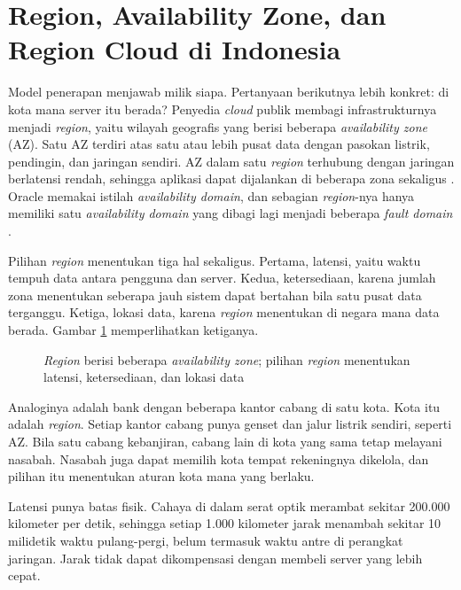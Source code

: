 \section{Region, Availability Zone, dan Region Cloud di Indonesia}

Model penerapan menjawab milik siapa. Pertanyaan berikutnya lebih konkret: di kota mana
server itu berada? Penyedia \textit{cloud} publik membagi infrastrukturnya menjadi
\textit{region}, yaitu wilayah geografis yang berisi beberapa \textit{availability zone}
(AZ). Satu AZ terdiri atas satu atau lebih pusat data dengan pasokan listrik, pendingin, dan
jaringan sendiri. AZ dalam satu \textit{region} terhubung dengan jaringan berlatensi rendah,
sehingga aplikasi dapat dijalankan di beberapa zona sekaligus
\cite{c02-aws-regions,c02-gcp-zones}. Oracle memakai istilah \textit{availability domain},
dan sebagian \textit{region}-nya hanya memiliki satu \textit{availability domain} yang
dibagi lagi menjadi beberapa \textit{fault domain} \cite{c02-oci-regions}.

Pilihan \textit{region} menentukan tiga hal sekaligus. Pertama, latensi, yaitu waktu tempuh
data antara pengguna dan server. Kedua, ketersediaan, karena jumlah zona menentukan seberapa
jauh sistem dapat bertahan bila satu pusat data terganggu. Ketiga, lokasi data, karena
\textit{region} menentukan di negara mana data berada. Gambar \ref{fig:ch02-region-zona}
memperlihatkan ketiganya.

\begin{figure}[!htb]
  \centering
  
  \caption{\textit{Region} berisi beberapa \textit{availability zone}; pilihan
           \textit{region} menentukan latensi, ketersediaan, dan lokasi data}
  \label{fig:ch02-region-zona}
\end{figure}

Analoginya adalah bank dengan beberapa kantor cabang di satu kota. Kota itu adalah
\textit{region}. Setiap kantor cabang punya genset dan jalur listrik sendiri, seperti AZ.
Bila satu cabang kebanjiran, cabang lain di kota yang sama tetap melayani nasabah. Nasabah
juga dapat memilih kota tempat rekeningnya dikelola, dan pilihan itu menentukan aturan kota
mana yang berlaku.

Latensi punya batas fisik. Cahaya di dalam serat optik merambat sekitar 200.000 kilometer
per detik, sehingga setiap 1.000 kilometer jarak menambah sekitar 10 milidetik waktu
pulang-pergi, belum termasuk waktu antre di perangkat jaringan. Jarak tidak dapat
dikompensasi dengan membeli server yang lebih cepat.

